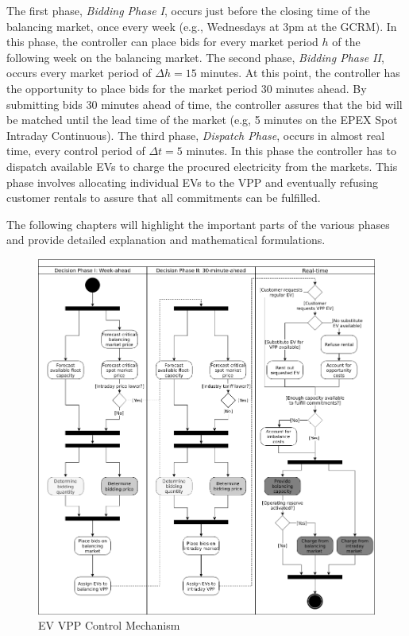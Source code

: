 \documentclass[a4paper, 12pt]{article}
\begin{document}
The first phase, \emph{Bidding Phase I}, occurs just before the closing time of the
balancing market, once every week (e.g., Wednesdays at 3pm at the GCRM). In this
phase, the controller can place bids for every market period \(h\) of the
following week on the balancing market. The second phase, \emph{Bidding Phase II},
occurs every market period of \(\Delta{h}\!=\!15\) minutes. At this point, the
controller has the opportunity to place bids for the market period 30 minutes
ahead. By submitting bids 30 minutes ahead of time, the controller assures that
the bid will be matched until the lead time of the market (e.g, 5 minutes on the
EPEX Spot Intraday Continuous). The third phase, \emph{Dispatch Phase}, occurs in
almost real time, every control period of \(\Delta{t}\!=\!5\) minutes. In this
phase the controller has to dispatch available EVs to charge the procured
electricity from the markets. This phase involves allocating individual EVs to
the VPP and eventually refusing customer rentals to assure that all commitments
can be fulfilled.

The following chapters will highlight the important parts of the various phases
and provide detailed explanation and mathematical formulations.

\begin{figure}[htbp]
\centering
\includegraphics[width=1\linewidth]{./fig/control_mechanism.png}
\caption[EV VPP Control Mechanism]{EV VPP Control Mechanism \label{fig-control-mechanism}}
\end{figure}
\end{document}
